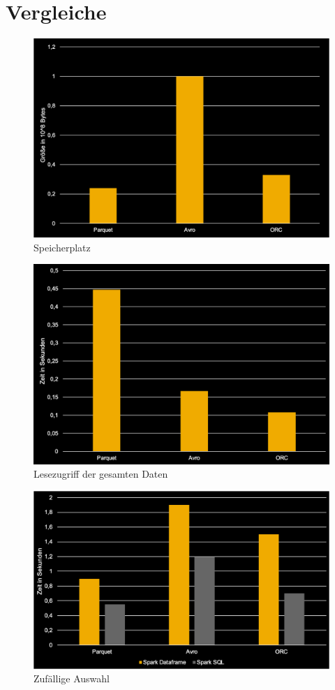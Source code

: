 \chapter{Vergleiche}
\begin{figure}[ht]
	\centering
	\includegraphics[width=1\textwidth]{Bilder/Speicher.png} 
	\caption{Speicherplatz}
	\label{fig:Speicherplatz}
\end{figure}
\clearpage
\begin{figure}[ht]
	\centering
	\includegraphics[width=1\textwidth]{Bilder/Lesezugriff.png} 
	\caption{Lesezugriff der gesamten Daten}
	\label{fig:Lesezugriff}
\end{figure}
\clearpage
\begin{figure}[ht]
	\centering
	\includegraphics[width=1\textwidth]{Bilder/Zufall.png} 
	\caption{Zufällige Auswahl}
	\label{fig:Zufall}
\end{figure}
